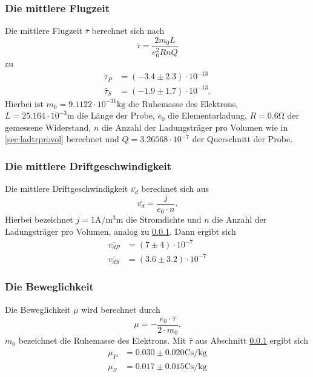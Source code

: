     \subsubsection{Die mittlere Flugzeit}
    \label{sec:mitflugz}
      Die mittlere Flugzeit $\bar{\tau}$ berechnet sich nach
      \begin{equation*}
        \bar{\tau} = \frac{2m_{0}L}{e_{0}^{2}RnQ}
      \end{equation*}
      zu
      \begin{align}
        \bar{\tau}_{P} & = (-3.4 \pm 2.3) \cdot 10^{-13} \\
        \bar{\tau}_{S} & = (-1.9 \pm 1.7) \cdot 10^{-13}.
      \end{align}
      Hierbei ist $m_{0} = 9.1122 \cdot 10^{-31} \si{\kilo\gram}$ die Ruhemasse des Elektrons, $L = 25.164 \cdot 10^{-3} \si{\meter}$ die Länge der Probe,
      $e_{0}$ die Elementarladung, $R = 0.6 \si{\ohm}$ der gemessene Widerstand, $n$ die Anzahl der Ladungsträger pro Volumen wie in \ref{sec:ladtrprovol} berechnet
      und $Q = 3.26568 \cdot 10^{-7}$ der Querschnitt der Probe.
    \subsubsection{Die mittlere Driftgeschwindigkeit}
      Die mittlere Driftgeschwindigkeit $\bar{v_{d}}$ berechnet sich aus
      \begin{equation}
        \bar{v_{d}} = \frac{j}{e_{0} \cdot n}.
      \end{equation}
      Hierbei bezeichnet $j = 1 \si{\ampere\per\cubic\milli\meter}$ die Stromdichte und $n$ die Anzahl der Ladungsträger pro Volumen, analog zu \ref{sec:mitflugz}.
      Dann ergibt sich
      \begin{align}
        \bar{v_{dP}} & = (7 \pm 4) \cdot 10^{-7} \\
        \bar{v_{dS}} & = (3.6 \pm 3.2) \cdot 10^{-7}
      \end{align}
    \subsubsection{Die Beweglichkeit}
      Die Beweglichkeit $\mu$ wird berechnet durch
      \begin{equation}
        \mu = -\frac{e_{0} \cdot \bar{\tau}}{2 \cdot m_{0}}.
      \end{equation}
      $m_{0}$ bezeichnet die Ruhemasse des Elektrons. Mit $\bar{\tau}$ aus Abschnitt \ref{sec:mitflugz} ergibt sich
      \begin{align}
        \mu_{P} & = 0.030 \pm 0.020 \si{\coulomb\second\per\kilo\gram}\\
        \mu_{S} & = 0.017 \pm 0.015 \si{\coulomb\second\per\kilo\gram}
      \end{align}
